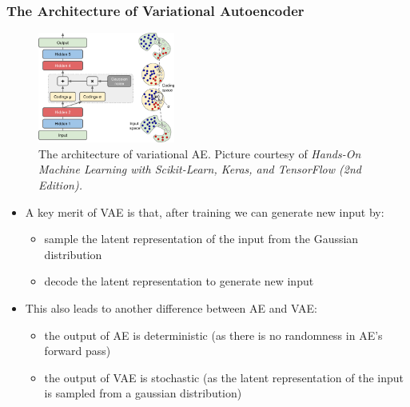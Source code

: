 \documentclass{beamer}
\begin{document}
\begin{frame}
\setlength{\leftmargini}{0.3cm}
\setlength{\leftmarginii}{0.6cm}
\setlength{\leftmarginiii}{0.9cm}
\frametitle{The Architecture of Variational Autoencoder}
\begin{figure}[h!]
\centering
\includegraphics[width=0.4\textwidth]{./figure/vae}
\renewcommand\thefigure{3}
\addtocounter{figure}{-1}
\caption{The architecture of variational AE. Picture courtesy of \emph{Hands-On Machine Learning with Scikit-Learn, Keras, and TensorFlow (2nd Edition).}}
\end{figure}
\vspace{-0.4cm}
\begin{itemize}
\footnotesize
\item A key merit of VAE is that, after training we can generate new input by:
	\begin{itemize}
	\footnotesize
	\item sample the latent representation of the input from the Gaussian distribution
	\item decode the latent representation to generate new input
	\end{itemize} 
\item This also leads to another difference between AE and VAE:
	\begin{itemize}
	\footnotesize
	\item the output of AE is deterministic (as there is no randomness in AE's forward pass)
	\item the output of VAE is stochastic (as the latent representation of the input is sampled from a gaussian distribution)
	\end{itemize}
\end{itemize}
\end{frame}

\end{document}
